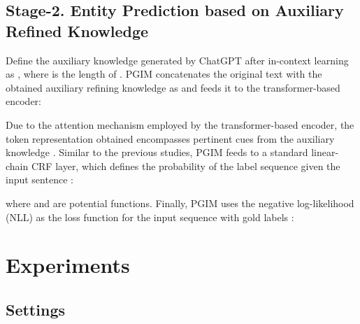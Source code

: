 \documentclass[11pt]{article}
\begin{document}
\subsection{Stage-2. Entity Prediction based on Auxiliary Refined Knowledge} \label{sec:3.3}
Define the auxiliary knowledge generated by ChatGPT after in-context learning as , where  is the length of . 
PGIM concatenates the original text  with the obtained auxiliary refining knowledge  as  and feeds it to the transformer-based encoder:
\vspace{-3pt}

Due to the attention mechanism employed by the transformer-based encoder, the token representation  obtained encompasses pertinent cues from the auxiliary knowledge . Similar to the previous studies, PGIM feeds  to a standard linear-chain CRF layer, which defines the probability of the label sequence  given the input sentence :

where  and  are potential functions. Finally, PGIM uses the negative log-likelihood (NLL) as the loss function for the input sequence with gold labels :
\vspace{-3pt}


\section{Experiments}
\subsection{Settings}
\end{document}
